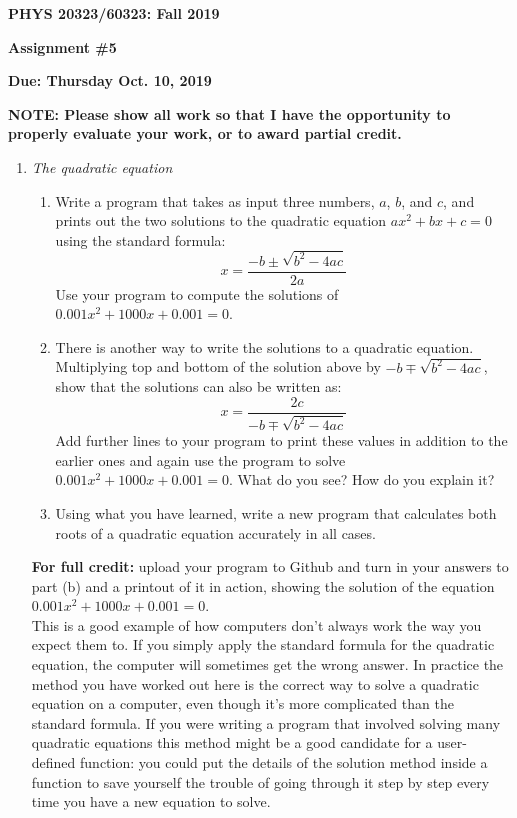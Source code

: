 \documentclass[12pt]{article}
\begin{document}
\centerline{\bf PHYS 20323/60323: Fall 2019}
\medskip
\centerline{\bf Assignment \#5}%
\medskip
\centerline{\bf Due: Thursday Oct. 10, 2019}
\vskip 0.15in

{\bf NOTE: Please show all work so that I  have the opportunity to properly
evaluate your work, or to award partial credit.}

\begin{enumerate}


\item {\it The quadratic equation}

\begin{enumerate}
\item Write a program that takes as input three numbers, $a$, $b$, and $c$, and prints out the two solutions to the quadratic equation $ax^2 + bx + c = 0$ using the standard
formula:
\begin{equation}
x = \frac{-b \pm \sqrt{b^2 - 4ac}}{2a}
\end{equation}
Use your program to compute the solutions of $0.001x^2 + 1000x + 0.001 = 0$.\\


\item There is another way to write the solutions to a quadratic equation. Multiplying top and bottom of the solution above by $-b \mp \sqrt{b^2 - 4ac}$, show that the solutions
can also be written as:
\begin{equation}
x = \frac{2c}{-b \mp \sqrt{b^2 - 4ac}}
\end{equation}
Add further lines to your program to print these values in addition to the earlier ones and again use the program to solve $0.001x^2 + 1000x + 0.001 = 0$. What do you see? How do you explain it?\\

\item Using what you have learned, write a new program that calculates both roots of a quadratic equation accurately in all cases.

\end{enumerate}

{\bf For full credit:} upload your program to Github and turn in your answers to
part (b) and a printout of it in action, showing the solution of the equation $0.001x^2 + 1000x + 0.001 = 0$.\\

This is a good example of how computers don’t always work the way you expect them to. If you simply apply the standard formula for the quadratic equation, the computer will sometimes get the wrong answer. In practice the method you have worked out here is the correct way to solve a quadratic equation on a computer, even though it’s more complicated than the standard formula. If you were writing a program that involved solving many quadratic equations this method might be a good candidate for a user- defined function: you could put the details of the solution method inside a function to save yourself the trouble of going through it step by step every time you have a new equation to solve.



\end{enumerate}
\end{document}
